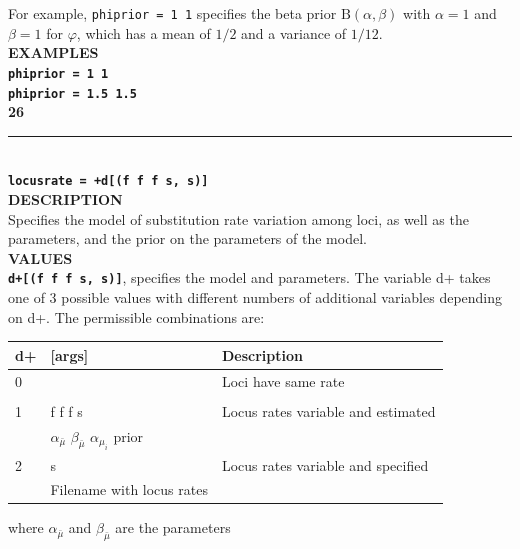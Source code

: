 \documentclass{book}
\numberwithin{equation}{section} \renewcommand{\baselinestretch}{0.55}
\begin{document}
For example, \texttt{phiprior = 1 1} specifies the beta prior
$\textrm{B}(\alpha,\beta)$ with $\alpha = 1$ and $\beta
= 1$ for  $\varphi$, which has a mean of $1/2$ and a variance of $1/12$. \vspace{5pt}\\
\textbf{EXAMPLES} \vspace{5pt}\\
\textbf{\texttt{phiprior = 1 1}} \vspace{5pt}\\
\textbf{\texttt{phiprior = 1.5 1.5}}\vspace{10pt}\\
\textbf{{\large 26}} \\
\noindent\rule{\textwidth}{0.8pt} \\
\textbf{{\Large \texttt{locusrate = +d[(f f f s, s)]}}} \vspace{5pt}\\
\textbf{DESCRIPTION} \vspace{5pt}\\
Specifies the model of substitution rate variation among loci, as well
as the parameters, and the prior on the parameters of the model.
\vspace{5pt}\\
\textbf{VALUES} \vspace{5pt}\\
\textbf{\texttt{d+[(f f f s, s)]}}, specifies the model and
parameters. The variable d+ takes one of 3 possible values with
different numbers of additional variables depending on d+. The
permissible combinations are:
\begin{table}[H]
  \begin{tabular}{@{}lll@{}}
    \toprule
    \textbf{d+} & \textbf{{[}args{]}}  & \textbf{Description} \\ \midrule
    0 &  & Loci have same rate \\
                &  &  \\
    1 & f f f s & Locus rates variable and estimated \\
                & $\alpha_{\bar{\mu}} \,\, \beta_{\bar{\mu}} \,\, \alpha_{\mu_i}$ prior & \\
    2 & s & Locus rates variable and specified \\ 
                & Filename with locus rates & \\ \bottomrule
  \end{tabular}
\end{table}
\noindent
where $\alpha_{\bar{\mu}}$ and $\beta_{\bar{\mu}}$ are the parameters
\end{document}
